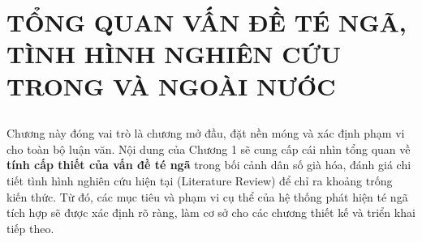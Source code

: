 \chapter[TỔNG QUAN VẤN ĐỀ TÉ NGÃ]{TỔNG QUAN VẤN ĐỀ TÉ NGÃ, TÌNH HÌNH NGHIÊN CỨU TRONG VÀ NGOÀI NƯỚC}
\label{chap:introduction} %

\section*{} %
Chương này đóng vai trò là chương mở đầu, đặt nền móng và xác định phạm vi cho toàn bộ luận văn. Nội dung của Chương 1 sẽ cung cấp cái nhìn tổng quan về \textbf{tính cấp thiết của vấn đề té ngã} trong bối cảnh dân số già hóa, đánh giá chi tiết tình hình nghiên cứu hiện tại (Literature Review) để chỉ ra khoảng trống kiến thức. Từ đó, các mục tiêu và phạm vi cụ thể của hệ thống phát hiện té ngã tích hợp sẽ được xác định rõ ràng, làm cơ sở cho các chương thiết kế và triển khai tiếp theo.






